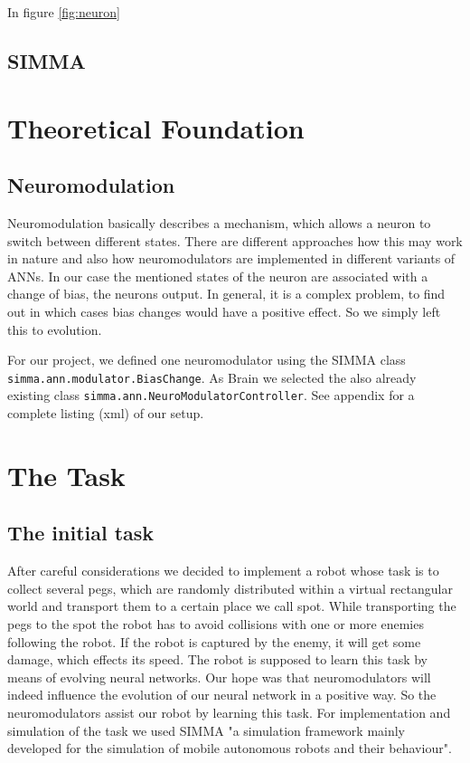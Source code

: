 \documentclass[12pt,fleqn,a4paper]{article}
\begin{document}
In figure \ref{fig:neuron}

\subsection{SIMMA}

\section{Theoretical Foundation}
\subsection{Neuromodulation}
Neuromodulation basically describes a mechanism, which allows a neuron to switch between different states. There are different approaches how this may work in nature and also how neuromodulators are implemented in different variants of ANNs. In our case the mentioned states of the neuron are associated with a change of bias, the neurons output. In general, it is a complex problem, to find out in which cases bias changes would have a positive effect. So we simply left this to evolution.

For our project, we defined one neuromodulator using the SIMMA class\\ \texttt{simma.ann.modulator.BiasChange}. As Brain we selected the also already existing class \texttt{simma.ann.NeuroModulatorController}. See appendix for a complete listing (xml) of our setup.

\section{The Task}

\subsection{The initial task}
After careful considerations we decided to implement a robot whose task is to collect several pegs, which are randomly distributed within a virtual rectangular world and transport them to a certain place we call spot. While transporting the pegs to the spot the robot has to avoid collisions with one or more enemies following the robot. If the robot is captured by the enemy, it will get some damage, which effects its speed. The robot is supposed to learn this task by means of evolving neural networks. Our hope was that neuromodulators will indeed influence the evolution of our neural network in a positive way. So the neuromodulators assist our robot by learning this task. For implementation and simulation of the task we used SIMMA "a simulation framework mainly developed for the simulation of mobile autonomous robots and their behaviour". 
\end{document}

